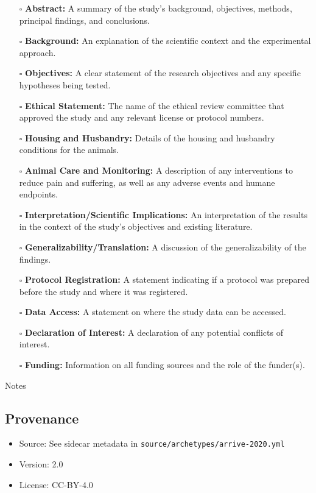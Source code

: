 \documentclass[11pt]{article}
\def\tightlist{}
\begin{document}
\begin{Form}
\begin{itemize}
\tightlist
\item[$\square$]
  \textbf{Abstract:} A summary of the study's background, objectives,
  methods, principal findings, and conclusions.
\item[$\square$]
  \textbf{Background:} An explanation of the scientific context and the
  experimental approach.
\item[$\square$]
  \textbf{Objectives:} A clear statement of the research objectives and
  any specific hypotheses being tested.
\item[$\square$]
  \textbf{Ethical Statement:} The name of the ethical review committee
  that approved the study and any relevant license or protocol numbers.
\item[$\square$]
  \textbf{Housing and Husbandry:} Details of the housing and husbandry
  conditions for the animals.
\item[$\square$]
  \textbf{Animal Care and Monitoring:} A description of any
  interventions to reduce pain and suffering, as well as any adverse
  events and humane endpoints.
\item[$\square$]
  \textbf{Interpretation/Scientific Implications:} An interpretation of
  the results in the context of the study's objectives and existing
  literature.
\item[$\square$]
  \textbf{Generalizability/Translation:} A discussion of the
  generalizability of the findings.
\item[$\square$]
  \textbf{Protocol Registration:} A statement indicating if a protocol
  was prepared before the study and where it was registered.
\item[$\square$]
  \textbf{Data Access:} A statement on where the study data can be
  accessed.
\item[$\square$]
  \textbf{Declaration of Interest:} A declaration of any potential
  conflicts of interest.
\item[$\square$]
  \textbf{Funding:} Information on all funding sources and the role of
  the funder(s).
\end{itemize}

{Notes}

\subsection{Provenance}\label{provenance}

\begin{itemize}
\tightlist
\item
  Source: See sidecar metadata in
  \texttt{source/archetypes/arrive-2020.yml}
\item
  Version: 2.0
\item
  License: CC-BY-4.0
\end{itemize}

\end{Form}
\end{document}
